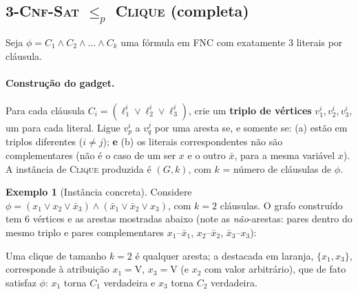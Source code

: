 \documentclass[9pt,a4paper]{extarticle}
\newcommand{\impt}[1]{\textcolor{important}{\textbf{#1}}}
\theoremstyle{definition}
\newtheorem{example}{Exemplo}[section]
\begin{document}
\subsection{\textsc{3-Cnf-Sat} \(\leq_p\) \textsc{Clique} (completa)}\label{sec:3sat-clique}

Seja \(\phi = C_1 \wedge C_2 \wedge \dots \wedge C_k\) uma fórmula em FNC com exatamente 3 literais por cláusula.

\paragraph{Construção do gadget.} Para cada cláusula \(C_i = (\ell_1^i \vee \ell_2^i \vee \ell_3^i)\), crie um \impt{triplo de vértices} \(v_1^i, v_2^i, v_3^i\), um para cada literal. Ligue \(v_p^i\) a \(v_q^j\) por uma aresta se, e somente se: (a) estão em triplos diferentes (\(i \neq j\)); \textbf{e} (b) os literais correspondentes não são complementares (não é o caso de um ser \(x\) e o outro \(\bar x\), para a mesma variável \(x\)). A instância de \textsc{Clique} produzida é \((G, k)\), com \(k\) = número de cláusulas de \(\phi\).

\begin{example}[Instância concreta]\label{ex:3sat-clique}
Considere \(\phi = (x_1 \vee x_2 \vee \bar x_3) \wedge (\bar x_1 \vee \bar x_2 \vee x_3)\), com \(k=2\) cláusulas. O grafo construído tem 6 vértices e as arestas mostradas abaixo (note as \emph{não}-arestas: pares dentro do mesmo triplo e pares complementares \(x_1\)--\(\bar x_1\), \(x_2\)--\(\bar x_2\), \(\bar x_3\)--\(x_3\)):

\begin{center}
\end{center}

Uma clique de tamanho \(k=2\) é qualquer aresta; a destacada em laranja, \(\{x_1, x_3\}\), corresponde à atribuição \(x_1 = \mathrm{V}\), \(x_3 = \mathrm{V}\) (e \(x_2\) com valor arbitrário), que de fato satisfaz \(\phi\): \(x_1\) torna \(C_1\) verdadeira e \(x_3\) torna \(C_2\) verdadeira.
\end{example}
\end{document}
